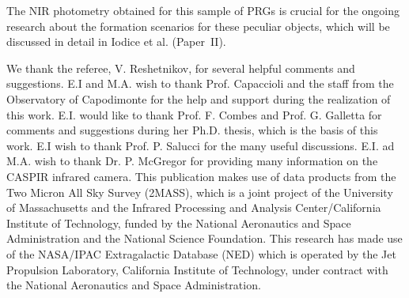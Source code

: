 \documentclass{aa}
\begin{document}
The NIR photometry obtained for this sample of PRGs is crucial for the
ongoing research about the formation scenarios for these peculiar objects, which
will be discussed in detail in Iodice et al. \cite{paperII} (Paper~II). 


\begin{acknowledgements}
We thank the referee, V. Reshetnikov, for several helpful comments and 
suggestions.
E.I and M.A. wish to thank Prof. Capaccioli and the staff from the 
Observatory of Capodimonte for the help and support during the realization
of this work. E.I. would like to thank Prof. F. Combes and Prof. G. Galletta 
for comments and suggestions during her Ph.D. thesis, which is the basis of 
this work.
E.I wish to thank Prof. P. Salucci for the many useful discussions. 
E.I. ad M.A. wish to thank Dr. P. McGregor for providing many information on 
the CASPIR infrared camera.
This publication makes use of data products from the Two Micron All Sky 
Survey (2MASS), which is a joint project of the University of Massachusetts 
and the Infrared Processing 
and Analysis Center/California Institute of Technology, funded by the National 
Aeronautics and Space Administration and the National Science Foundation.
This research has made use of the NASA/IPAC Extragalactic Database (NED) which 
is operated by the Jet Propulsion Laboratory, California Institute of 
Technology, under contract with the National Aeronautics and Space 
Administration.
\end{acknowledgements}
\end{document}
